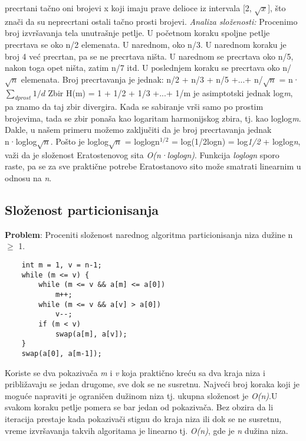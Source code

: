 \documentclass{article}
\begin{document}
precrtani tačno oni brojevi x koji imaju prave delioce iz \hspace*{0.8cm}intervala [2,
$\sqrt{x}$], što
znači da su neprecrtani ostali tačno prosti brojevi.
\vspace{0.3cm}\newline \textit{Analiza složenosti:}
\newline Procenimo broj izvršavanja tela unutrašnje
petlje. U početnom koraku spoljne petlje precrtava se oko n/2 elemenata. U
narednom, oko n/3. U narednom koraku je broj 4 već precrtan, pa se ne precrtava ništa. U narednom se precrtava oko n/5, nakon toga opet ništa, zatim n/7 itd. U poslednjem koraku se precrtava oko n/$\sqrt{n}$
elemenata. Broj precrtavanja je jednak:
\newline \hspace*{2cm} n/2 + n/3 + n/5 +...+ n/$\sqrt{n}$ = n·$\sum_{d prost}{1/d}$
\vspace{0.2cm}\newline Zbir H(m) = 1 + 1/2 + 1/3 +...+ 1/m je asimptotski jednak log\textit{m}, pa znamo da taj zbir divergira. Kada se sabiranje
vrši samo po prostim brojevima, tada se zbir ponaša kao logaritam harmonijskog zbira, tj. kao loglog\textit{m}. Dakle, u našem primeru možemo zaključiti da je broj precrtavanja jednak n·loglog\textit{$\sqrt{n}$}. Pošto je loglog\textit{$\sqrt{n}$} = loglogn$^{1/2}$ = log(1/2logn) = log\textit{1/2} + loglog\textit{n}, važi da je složenost Eratostenovog sita \textit{O(n·loglogn)}. Funkcija \textit{loglogn} sporo raste, pa se za sve praktične potrebe Eratostanovo sito može smatrati linearnim u odnosu na \textit{n}.

\subsection{Složenost particionisanja}
\textbf{Problem}: Proceniti složenost narednog algoritma particionisanja niza dužine n $\geq$ 1.
\begin{lstlisting}
    int m = 1, v = n-1;
    while (m <= v) {
        while (m <= v && a[m] <= a[0])
            m++;
        while (m <= v && a[v] > a[0])
            v--;
        if (m < v)
            swap(a[m], a[v]);
    }
    swap(a[0], a[m-1]);
\end{lstlisting}
Koriste se dva pokazivača \textit{m} i \textit{v} koja praktično
kreću sa dva kraja niza i približavaju se jedan drugome, sve dok se ne susretnu. Najveći broj koraka koji je moguće napraviti je ograničen
dužinom niza tj. ukupna složenost je \textit{O(n)}.U svakom koraku petlje pomera se bar jedan od pokazivača. Bez obzira da li iteracija prestaje kada pokazivači stignu do kraja niza ili dok se ne susretnu,
vreme izvršavanja takvih algoritama je linearno tj. \textit{O(n)}, gde je \textit{n} dužina niza.
\end{document}
